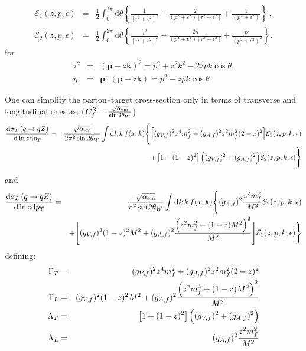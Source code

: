 \documentclass[aps,prd,preprint,superscriptaddress,nofootinbib]{revtex4-2}
\renewcommand{\dd}{\mathrm{d}}
\begin{document}
\begin{eqnarray}
\mathcal{E}_{1}(z,p,\epsilon) &=& 	\frac{1}{2}\int_{0}^{2\pi}\mathrm{d}\theta\left\{ \frac{1}{[\tau^{2}+\epsilon^{2}]^{2}}-\frac{2}{(p^{2}+\epsilon^{2})[\tau^{2}+\epsilon^{2}]}+\frac{1}{(p^{2}+\epsilon^{2})}\right\} \, , \\
\mathcal{E}_{2}(z,p,\epsilon) &=& 	\frac{1}{2}\int_{0}^{2\pi}\mathrm{d}\theta\left\{ \frac{\tau^{2}}{[\tau^{2}+\epsilon^{2}]^{2}}-\frac{2\eta}{(p^{2}+\epsilon^{2})[\tau^{2}+\epsilon^{2}]}+\frac{p^{2}}{(p^{2}+\epsilon^{2})^{2}}\right\} .
\end{eqnarray}
for
\begin{eqnarray}
\tau^{2} &=& (\boldsymbol{p}-z\boldsymbol{k})^{2}=p^{2}+z^{2}k^{2}-2zpk\cos\theta. \\	
\eta &=& \boldsymbol{p}\cdot(\boldsymbol{p}-z\boldsymbol{k})=p^{2}-zpk\cos\theta
\end{eqnarray}
\par 
One can simplify the parton--target cross-section only in terms of transverse and longitudinal ones as: ($C_f^{Z} = { \sqrt{\alpha_{\text{em}}} \over \sin 2\theta_W}$)
\begin{eqnarray}
\frac{\dd\sigma_{T}\left(q\rightarrow qZ\right)}{\dd\ln z\dd p_T} &=&
{ \sqrt{\alpha_{\text{em}}} \over 2\pi^2 \sin 2\theta_W}
\int \dd k\,k\,f(x,k) \Bigg\{ 
\Big[  (g_{V,f})^2 z^4 m^2_f + (g_{A,f})^2 z^2m^2_f (2-z)^2   \Big]
\mathcal{E}_1(z,p,k,\epsilon)
\nonumber \\ 
&& +\left[1+(1-z)^{2}\right]\Big( (g_{V,f})^2 + (g_{A,f})^2\Big)\mathcal{E}_{2}(z,p,k,\epsilon)
\Bigg\}
\end{eqnarray}
and 
\begin{eqnarray}
\frac{\dd\sigma_{L}\left(q\rightarrow qZ\right)}{\dd\ln z\dd p_T} &=&	
{ \sqrt{\alpha_{\text{em}}} \over \pi^2 \sin 2\theta_W}
\int \dd k\,k\,f(x,k) \Bigg\{ 
(g_{A,f})^2 {z^2m_f^2 \over M^2}
\mathcal{E}_2(z,p,k,\epsilon)
\nonumber \\ && +
\Bigg[ (g_{V,f})^2(1-z)^2M^2 + (g_{A,f})^2{\Big(z^2m_f^2 + (1-z)M^2\Big)^2 \over M^2 } \Bigg]
\mathcal{E}_1(z,p,k,\epsilon) \Bigg\} 
\nonumber \\ 
\end{eqnarray}
defining: 
\begin{eqnarray}
 \Gamma_T & = & (g_{V,f})^2 z^4 m^2_f + (g_{A,f})^2 z^2m^2_f (2-z)^2  \\
 \Gamma_L & = & (g_{V,f})^2(1-z)^2M^2 + (g_{A,f})^2{\Big(z^2m_f^2 + (1-z)M^2\Big)^2 \over M^2 } \\
 \Lambda_T & = & \left[1+(1-z)^{2}\right]\Big( (g_{V,f})^2 + (g_{A,f})^2\Big)\\
 \Lambda_L & = & (g_{A,f})^2 {z^2m_f^2 \over M^2}
\end{eqnarray}
\end{document}
